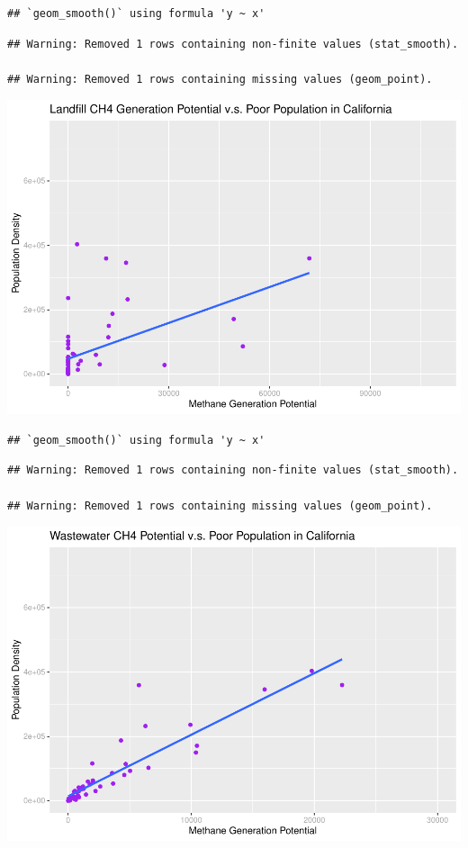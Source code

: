 \documentclass[
  12pt,
]{article}
\begin{document}
\begin{verbatim}
## `geom_smooth()` using formula 'y ~ x'
\end{verbatim}

\begin{verbatim}
## Warning: Removed 1 rows containing non-finite values (stat_smooth).

## Warning: Removed 1 rows containing missing values (geom_point).
\end{verbatim}

\includegraphics{FDR_ProjectReport_files/figure-latex/unnamed-chunk-7-2.pdf}

\begin{verbatim}
## `geom_smooth()` using formula 'y ~ x'
\end{verbatim}

\begin{verbatim}
## Warning: Removed 1 rows containing non-finite values (stat_smooth).

## Warning: Removed 1 rows containing missing values (geom_point).
\end{verbatim}

\includegraphics{FDR_ProjectReport_files/figure-latex/unnamed-chunk-7-3.pdf}
\end{document}
